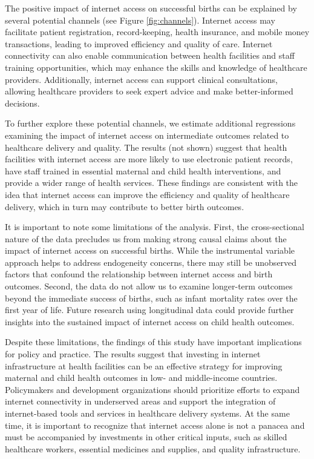 \documentclass[12pt]{article}
\begin{document}
The positive impact of internet access on successful births can be explained by several potential channels (see Figure \ref{fig:channels}). Internet access may facilitate patient registration, record-keeping, health insurance, and mobile money transactions, leading to improved efficiency and quality of care. Internet connectivity can also enable communication between health facilities and staff training opportunities, which may enhance the skills and knowledge of healthcare providers. Additionally, internet access can support clinical consultations, allowing healthcare providers to seek expert advice and make better-informed decisions.

To further explore these potential channels, we estimate additional regressions examining the impact of internet access on intermediate outcomes related to healthcare delivery and quality. The results (not shown) suggest that health facilities with internet access are more likely to use electronic patient records, have staff trained in essential maternal and child health interventions, and provide a wider range of health services. These findings are consistent with the idea that internet access can improve the efficiency and quality of healthcare delivery, which in turn may contribute to better birth outcomes.

It is important to note some limitations of the analysis. First, the cross-sectional nature of the data precludes us from making strong causal claims about the impact of internet access on successful births. While the instrumental variable approach helps to address endogeneity concerns, there may still be unobserved factors that confound the relationship between internet access and birth outcomes. Second, the data do not allow us to examine longer-term outcomes beyond the immediate success of births, such as infant mortality rates over the first year of life. Future research using longitudinal data could provide further insights into the sustained impact of internet access on child health outcomes.

Despite these limitations, the findings of this study have important implications for policy and practice. The results suggest that investing in internet infrastructure at health facilities can be an effective strategy for improving maternal and child health outcomes in low- and middle-income countries. Policymakers and development organizations should prioritize efforts to expand internet connectivity in underserved areas and support the integration of internet-based tools and services in healthcare delivery systems. At the same time, it is important to recognize that internet access alone is not a panacea and must be accompanied by investments in other critical inputs, such as skilled healthcare workers, essential medicines and supplies, and quality infrastructure.
\end{document}
